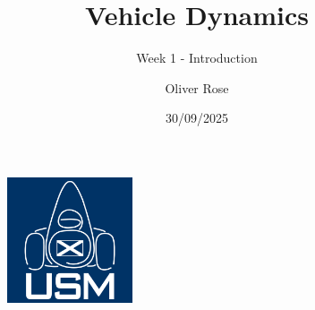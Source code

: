 \documentclass{beamer}
\title{Vehicle Dynamics}
\subtitle{Week 1 - Introduction}
\author{Oliver Rose}
\institute{University of Strathclyde Motorsport}
\date{30/09/2025}
\begin{document}
\begin{frame}
    \maketitle
\end{frame}





\begin{frame}[focus]
    \begin{figure}
        \includegraphics[width=0.33\textwidth]{../../res/usm-logo.png}
    \end{figure}
\end{frame}
\end{document}
